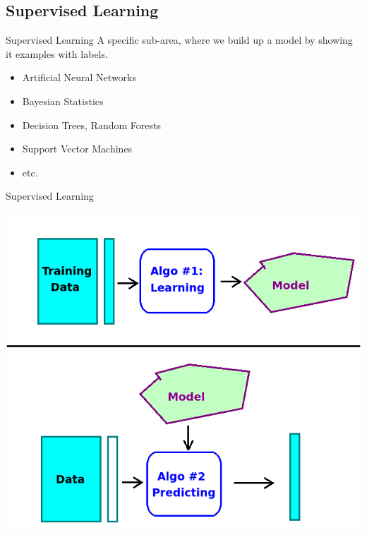 \documentclass[15pt]{beamer}
\begin{document}
\subsection{Supervised Learning}


\begin{frame}{Supervised Learning}
    A specific sub-area, where we build up a \alert{model}
    by showing it \alert{examples} with \alert{labels}.

    \vspace{3mm}
    \begin{itemize}\itemsep0.6em
        \item Artificial Neural Networks
        \item Bayesian Statistics
        \item Decision Trees, Random Forests
        \item Support Vector Machines
        \item etc.
    \end{itemize}
\end{frame}


\begin{frame}{Supervised Learning}
    \begin{center}
        \includegraphics[scale=.5]{img/howitworks.png}
    \end{center}
\end{frame}
\end{document}
